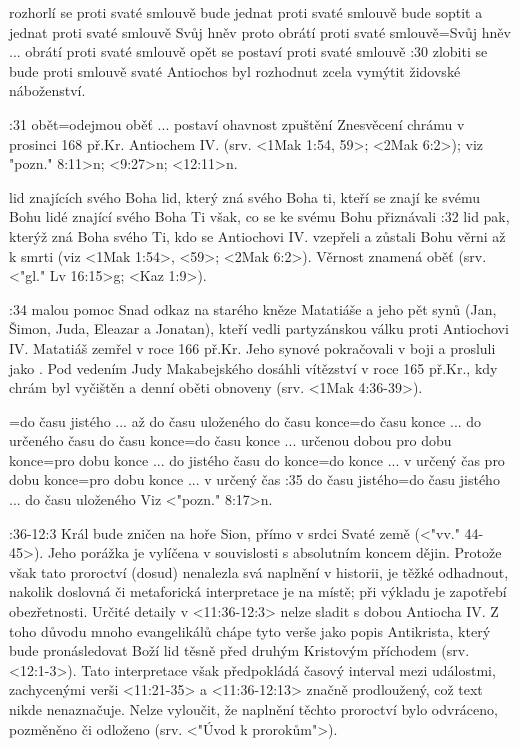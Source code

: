     {rozhorlí se proti svaté smlouvě}   %
    {bude jednat proti svaté smlouvě}   %
    {bude soptit a jednat proti svaté smlouvě}   %
    {Svůj hněv proto obrátí proti svaté smlouvě}={Svůj hněv ... obrátí proti svaté smlouvě}   %
    {opět se postaví proti svaté smlouvě}  %
:30 {zlobiti se bude proti smlouvě svaté}
    Antiochos byl rozhodnut zcela vymýtit židovské náboženství.
    
    

:31 {obět}={odejmou oběť ... postaví ohavnost zpuštění} 
Znesvěcení chrámu v prosinci 168 př.Kr. Antiochem IV. (srv. <1Mak 1:54, 59>; <2Mak 6:2>); viz \<"pozn." 8:11>n; <9:27>n; <12:11>n.


    
    {lid znajících svého Boha}   %
    {lid, který zná svého Boha}   %
    {ti, kteří se znají ke svému Bohu}   %
    {lidé znající svého Boha}   %
    {Ti však, co se ke svému Bohu přiznávali}   %
:32 {lid pak, kterýž zná Boha svého}
    Ti, kdo se Antiochovi IV. vzepřeli a zůstali Bohu věrni až k smrti (viz <1Mak 1:54>, <59>; <2Mak 6:2>). Věrnost znamená oběť (srv. 
    <"gl." Lv 16:15>g; <Kaz 1:9>).


:34 {malou pomoc}  Snad odkaz na starého kněze Matatiáše a jeho pět synů (Jan, Šimon, Juda, Eleazar a Jonatan), kteří vedli partyzánskou válku proti Antiochovi IV. Matatiáš zemřel v roce 166 př.Kr. Jeho synové pokračovali v boji a prosluli jako . Pod vedením Judy Makabejského dosáhli vítězství v roce 165 př.Kr., kdy chrám byl vyčištěn a denní oběti obnoveny (srv. <1Mak 4:36-39>).

={do času jistého ... až do času uloženého}   %
    {do času konce}={do času konce ... do určeného času}   %
    {do času konce}={do času konce ... určenou dobou}   %
    {pro dobu konce}={pro dobu konce ... do jistého času}   %
    {do konce}={do konce ... v určený čas}   %
    {pro dobu konce}={pro dobu konce ... v určený čas}   %
:35 {do času jistého}={do času jistého ... do času uloženého}  
    Viz <"pozn." 8:17>n.
    

:36-12:3 {}
    Král bude zničen na hoře Sion, přímo v srdci Svaté země (<"vv." 44-45>).  
    Jeho porážka je vylíčena v souvislosti s absolutním koncem dějin.
    Protože však tato proroctví (dosud)  nenalezla svá naplnění v historii, je těžké odhadnout, nakolik doslovná či metaforická interpretace je na místě; při  výkladu je zapotřebí obezřetnosti. 
    Určité detaily v <11:36-12:3> nelze sladit s dobou Antiocha IV.
    Z toho důvodu mnoho evangelikálů chápe tyto verše jako popis Antikrista, který bude pronásledovat Boží lid těsně před druhým Kristovým příchodem (srv. <12:1-3>). Tato interpretace však předpokládá  časový interval mezi událostmi, zachycenými  verši <11:21-35> a  <11:36-12:13> značně prodloužený, což  text nikde nenaznačuje.
    Nelze vyloučit, že naplnění těchto proroctví bylo odvráceno,  pozměněno či odloženo (srv. <"Úvod k prorokům">).
    
